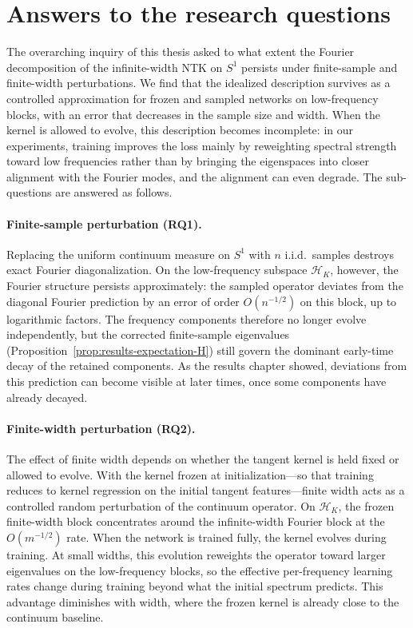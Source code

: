 \section{Answers to the research questions}
\label{sec:discussion-answers}

The overarching inquiry of this thesis asked to what extent the Fourier
decomposition of the infinite-width NTK on \(S^1\) persists under finite-sample
and finite-width perturbations. We find that the idealized description survives
as a controlled approximation for frozen and sampled networks on low-frequency
blocks, with an error that decreases in the sample size and width. When the
kernel is allowed to evolve, this description becomes incomplete: in our
experiments, training improves the loss mainly by reweighting spectral strength
toward low frequencies rather than by bringing the eigenspaces into closer
alignment with the Fourier modes, and the alignment can even degrade. The
sub-questions are answered as follows.

\paragraph{Finite-sample perturbation (RQ1).}
Replacing the uniform continuum measure on \(S^1\) with \(n\) i.i.d.\ samples
destroys exact Fourier diagonalization. On the low-frequency subspace
\(\mathcal{H}_K\), however, the Fourier structure persists approximately: the
sampled operator deviates from the diagonal Fourier prediction by an error of
order \(O(n^{-1/2})\) on this block, up to logarithmic factors. The frequency
components therefore no longer evolve independently, but the corrected
finite-sample eigenvalues (Proposition~\ref{prop:results-expectation-H}) still
govern the dominant early-time decay of the retained components. As the results
chapter showed, deviations from this prediction can become visible at later
times, once some components have already decayed.

\paragraph{Finite-width perturbation (RQ2).}
The effect of finite width depends on whether the tangent kernel is held fixed
or allowed to evolve. With the kernel frozen at initialization---so that
training reduces to kernel regression on the initial tangent features---finite
width acts as a controlled random perturbation of the continuum operator. On
\(\mathcal{H}_K\), the frozen finite-width block concentrates around the
infinite-width Fourier block at the \(O(m^{-1/2})\) rate. When the network is
trained fully, the kernel evolves during training. At small widths, this
evolution reweights the operator toward larger eigenvalues on the low-frequency
blocks, so the effective per-frequency learning rates change during training
beyond what the initial spectrum predicts. This advantage diminishes with
width, where the frozen kernel is already close to the continuum baseline.

